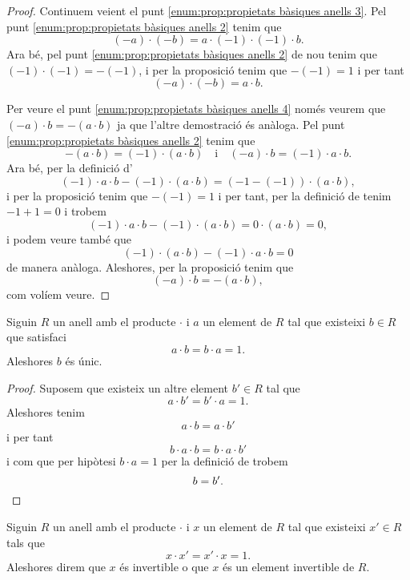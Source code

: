 \documentclass[../../Main.tex]{subfiles}
\begin{document}
\begin{proposition}
\begin{proof}
			Continuem veient el punt \eqref{enum:prop:propietats bàsiques anells 3}. Pel punt \eqref{enum:prop:propietats bàsiques anells 2} tenim que
			\[(-a)\cdot(-b)=a\cdot (-1)\cdot(-1)\cdot b.\]
			Ara bé, pel punt \eqref{enum:prop:propietats bàsiques anells 2} de nou tenim que \((-1)\cdot(-1)=-(-1)\), i per la proposició  tenim que \(-(-1)=1\) i per tant
			\[(-a)\cdot(-b)=a\cdot b.\]
			
			Per veure el punt \eqref{enum:prop:propietats bàsiques anells 4} només veurem que \((-a)\cdot b=-(a\cdot b)\) ja que l'altre demostració és anàloga. Pel punt \eqref{enum:prop:propietats bàsiques anells 2} tenim que
			\[-(a\cdot b)=(-1)\cdot(a\cdot b)\quad{\text{i}}\quad(-a)\cdot b=(-1)\cdot a\cdot b.\]
			Ara bé, per la definició d'
			\[(-1)\cdot a\cdot b-(-1)\cdot(a\cdot b)=(-1-(-1))\cdot(a\cdot b),\]
			i per la proposició  tenim que \(-(-1)=1\) i per tant, per la definició de  tenim \(-1+1=0\) i trobem
			\[(-1)\cdot a\cdot b-(-1)\cdot(a\cdot b)=0\cdot(a\cdot b)=0,\]
			i podem veure també que
			\[(-1)\cdot(a\cdot b)-(-1)\cdot a\cdot b=0\]
			de manera anàloga. Aleshores, per la proposició  tenim que
			\[(-a)\cdot b=-(a\cdot b),\]
			com volíem veure.
		\end{proof}
	\end{proposition}
	\begin{proposition}
		\label{prop:unicitat invers en anells}
		Siguin \(R\) un anell amb el producte \(\cdot\) i \(a\) un element de \(R\) tal que existeixi \(b\in R\) que satisfaci
		\[a\cdot b=b\cdot a=1.\]
		Aleshores \(b\) és únic.
		\begin{proof}
			Suposem que existeix un altre element \(b'\in R\) tal que
			\[a\cdot b'=b'\cdot a=1.\]
			Aleshores tenim
			\[a\cdot b=a\cdot b'\]
			i per tant
			\[b\cdot a\cdot b=b\cdot a\cdot b'\]
			i com que per hipòtesi \(b\cdot a=1\) per la definició de  trobem
			\[b=b'.\qedhere\]
		\end{proof}
	\end{proposition}
	\begin{definition}
		\label{def:element invertible pel producte d'un anell}
		Siguin \(R\) un anell amb el producte \(\cdot\) i \(x\) un element de \(R\) tal que existeixi \(x'\in R\) tals que
		\[x\cdot x'=x'\cdot x=1.\] 
		Aleshores direm que \(x\) és invertible o que \(x\) és un element invertible de \(R\).
	\end{definition}
\end{document}

